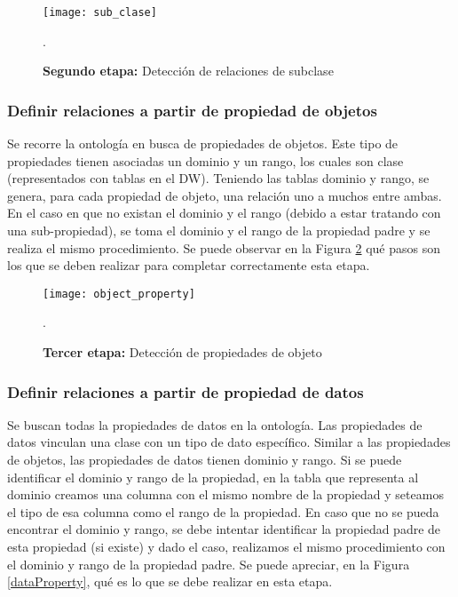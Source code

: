 \documentclass[a4paper,11pt]{article}
\begin{document}
    \begin{figure}[!htb]
      \begin{center}
        \texttt{[image: sub\_clase]}
        \caption{\textbf{Segundo etapa:} Detección de relaciones de subclase} \cite[p.~20]{ontologias}.
        \label{subClase}
      \end{center}
    \end{figure}
     
     
    \subsubsection{Definir relaciones a partir de propiedad de objetos}
    
    Se recorre la ontología en busca de propiedades de objetos. Este tipo de propiedades tienen asociadas un dominio y un rango, los cuales son clase
    (representados con tablas en el DW). Teniendo las tablas dominio y rango, se genera, para cada propiedad de objeto, una relación uno a muchos entre ambas. En
    el caso en que no existan el dominio y el rango (debido a estar tratando con una sub-propiedad), se toma el dominio y el rango de la propiedad padre y se
    realiza el mismo procedimiento. Se puede observar en la Figura \ref{objectProperty} qué pasos son los que se deben realizar para completar correctamente esta
    etapa.
    
    \begin{figure}[!htb]
      \begin{center}
        \texttt{[image: object\_property]}
        \caption{\textbf{Tercer etapa:} Detección de propiedades de objeto} \cite[p.~21]{ontologias}.
        \label{objectProperty}
      \end{center}
    \end{figure}
    
    
    \subsubsection{Definir relaciones a partir de propiedad de datos}
    
    Se buscan todas la propiedades de datos en la ontología. Las propiedades de datos vinculan una clase con un tipo de dato específico. Similar a las propiedades
    de objetos, las propiedades de datos tienen dominio y rango. Si se puede identificar el dominio y rango de la propiedad, en la tabla que representa al dominio
    creamos una columna con el mismo nombre de la propiedad y seteamos el tipo de esa columna como el rango de la propiedad. En caso que no se pueda encontrar el
    dominio y rango, se debe intentar identificar la propiedad padre de esta propiedad (si existe) y dado el caso, realizamos el mismo procedimiento con el
    dominio y rango de la propiedad padre. Se puede apreciar, en la Figura \ref{dataProperty}, qué es lo que se debe realizar en esta etapa.
    
\end{document}
